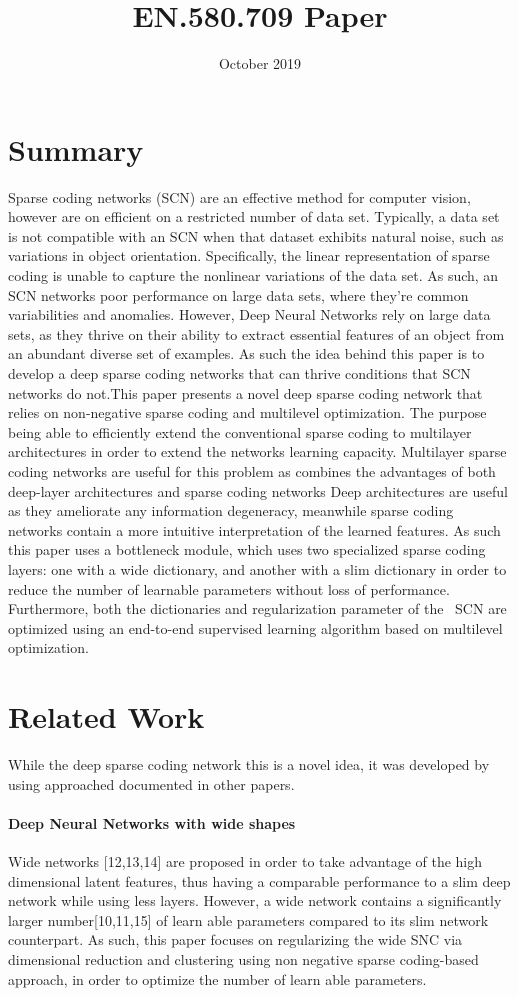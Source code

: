 \documentclass{article}
\title{EN.580.709 Paper}
\date{October 2019}
\begin{document}
\maketitle

\section{Summary}
Sparse coding networks (SCN) are an effective method for computer vision, however are on efficient on a restricted number of data set. Typically, a data set is not compatible with an SCN when that dataset exhibits natural noise, such as variations in object orientation. Specifically, the linear representation of sparse coding is unable to capture the nonlinear variations of the data set. As such, an SCN networks poor performance on large data sets, where they're common variabilities and anomalies. However, Deep Neural Networks rely on large data sets, as they thrive on their ability to extract essential features of an object from an abundant diverse set of examples. As such the idea behind this paper is to develop a deep sparse coding networks that can thrive conditions that SCN networks do not.This paper presents a novel deep sparse coding network that relies on non-negative sparse coding and multilevel optimization. The purpose being able to efficiently extend the conventional sparse coding to multilayer architectures in order to extend the networks learning capacity. Multilayer sparse coding networks are useful for this problem as combines the advantages of both deep-layer architectures and sparse coding networks Deep architectures are useful as they ameliorate any information degeneracy, meanwhile sparse coding networks contain a more intuitive interpretation of the learned features. As such this paper uses a bottleneck module, which uses two specialized sparse coding layers: one with a wide dictionary, and another with a slim dictionary in order to reduce the number of learnable parameters without loss of performance. Furthermore, both the dictionaries and regularization parameter of the  SCN are optimized using  an end-to-end supervised learning algorithm based on multilevel optimization.

\section{Related Work}
While the deep sparse coding network this is a novel idea, it was developed by using approached documented in other papers.
\paragraph{Deep Neural Networks with wide shapes\\}
Wide networks [12,13,14] are proposed in order to take advantage of the high dimensional latent features, thus having a comparable performance to a slim deep network while using less layers. However, a wide network contains a significantly larger number[10,11,15] of learn able parameters compared to its slim network counterpart. As such, this paper focuses on regularizing the wide SNC via dimensional reduction and clustering using non negative sparse coding-based approach, in order to optimize the number of learn able parameters.
\end{document}
